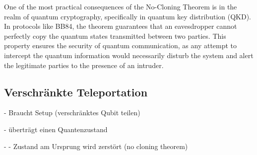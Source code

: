 One of the most practical consequences of the No-Cloning Theorem is in the realm of quantum cryptography,
specifically in quantum key distribution (QKD). In protocols like BB84, the theorem guarantees that an eavesdropper
cannot perfectly copy the quantum states transmitted between two parties.
This property ensures the security of quantum communication, as any attempt to intercept the quantum information
would necessarily disturb the system and alert the legitimate parties to the presence of an intruder.


\subsection{Verschränkte Teleportation}

- Braucht Setup (verschränktes Qubit teilen)

- überträgt einen Quantenzustand

- - Zustand am Ursprung wird zerstört (no cloning theorem)
